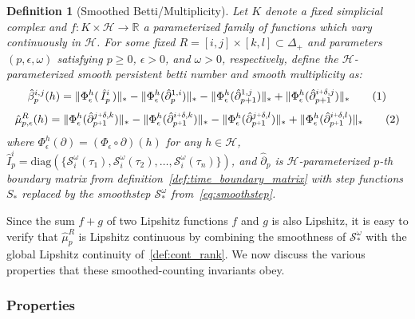 \documentclass[12pt]{article}
\numberwithin{equation}{section}
\newcommand{\+}{%
	\raisebox{0.18ex}{\scaleobj{0.55}{+}}
}
\newtheorem{definition}{Definition}
\theoremstyle{definition}
\newcommand\numberthis{\addtocounter{equation}{1}\tag{\theequation}}
\begin{document}
\begin{definition}[Smoothed Betti/Multiplicity]\label{def:smooth_mu}
Let $K$ denote a fixed simplicial complex and $f: K \times \mathcal{H} \to \mathbb{R}$ a parameterized family of functions which vary continuously in $\mathcal{H}$. For some fixed $R = [i,j] \times [k,l] \subset \Delta_+$ and parameters $(p, \epsilon, \omega)$ satisfying $p \geq 0$, $\epsilon > 0$, and $\omega > 0$, respectively, define the $\mathcal{H}$-parameterized \emph{smooth persistent betti number} and \emph{smooth multiplicity} as:
	\begin{equation}\label{eq:bett_cont}
\hat{\beta}_p^{i,j}(h) = 
\lVert \Phi_\epsilon^h(\,\hat{I}_{p}^i\,)\rVert_\ast -
\lVert \Phi_\epsilon^h(\hat{\partial}_{p}^{1, i}) \rVert_\ast - 
\lVert \Phi_\epsilon^h(\hat{\partial}_{p+1}^{1, j}) \rVert_\ast + 
\lVert \Phi_\epsilon^h(\hat{\partial}_{p+1}^{i\+\delta, j}) \rVert_\ast \numberthis
	\end{equation}
	\begin{equation}\label{eq:mu_cont}
	\hat{\mu}_{p,\epsilon}^R(h) = 
		 \lVert \Phi_\epsilon^h(\hat{\partial}_{p\+1}^{j \+ \delta, k}) \rVert_\ast - 
		 \lVert \Phi_\epsilon^h(\hat{\partial}_{p\+1}^{i \+ \delta, k}) \rVert_\ast -  
		 \lVert \Phi_\epsilon^h(\hat{\partial}_{p\+1}^{j \+ \delta, l}) \rVert_\ast + 
		 \lVert \Phi_\epsilon^h(\hat{\partial}_{p\+1}^{i \+ \delta, l}) \rVert_\ast \numberthis
\end{equation}
where $\Phi_\epsilon^h(\partial) = (\Phi_\epsilon \circ \partial)(h)$ for any $h \in \mathcal{H}$, $\hat{I}_{p}^i = \mathrm{diag}(\{ \mathcal{S}_i^\omega(\tau_1), \mathcal{S}_i^\omega(\tau_2), \dots, \mathcal{S}_i^\omega(\tau_n) \})$, and $\hat{\partial}_p$ is $\mathcal{H}$-parameterized $p$-th boundary matrix from definition~\ref{def:time_boundary_matrix} with step functions $S_\ast$ replaced by the smoothstep $\mathcal{S}_\ast^\omega$ from~\eqref{eq:smoothstep}.
\end{definition}
\noindent Since the sum $f + g$ of two Lipshitz functions $f$ and $g$ is also Lipshitz, it is easy to verify that $\hat{\mu}_p^R$ is Lipshitz continuous by combining the smoothness of $\mathcal{S}_\ast^\omega$ with the global Lipshitz continuity of~\eqref{def:cont_rank}. 
We now discuss the various properties that these smoothed-counting invariants obey. 

\subsubsection*{Properties}
\end{document}
